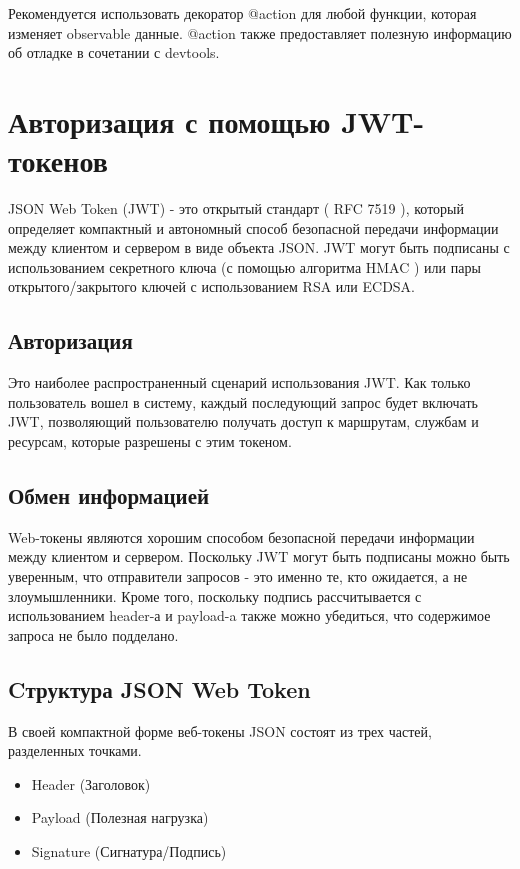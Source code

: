 \documentclass[12pt, a4paper]{diplom}
\begin{document}
Рекомендуется использовать декоратор @action для любой функции, которая изменяет observable данные. @action также предоставляет полезную информацию об отладке в сочетании с devtools.

\section{Авторизация с помощью JWT-токенов}

JSON Web Token (JWT)\cite{JWT} - это открытый стандарт ( RFC 7519 ), который определяет компактный и автономный способ безопасной передачи информации между клиентом и сервером в виде объекта JSON. 
JWT могут быть подписаны с использованием секретного ключа (с помощью алгоритма HMAC ) или пары открытого/закрытого ключей с использованием RSA или ECDSA.

\subsection{Авторизация}
Это наиболее распространенный сценарий использования JWT. Как только пользователь вошел в систему, каждый последующий запрос будет включать JWT, позволяющий пользователю получать доступ к маршрутам, службам и ресурсам, которые разрешены с этим токеном. 

\subsection{Обмен информацией}
Web-токены являются хорошим способом безопасной передачи информации между клиентом и сервером. Поскольку JWT могут быть подписаны можно быть уверенным, что отправители запросов - это именно те, кто ожидается, а не злоумышленники. Кроме того, поскольку подпись рассчитывается с использованием header-а и payload-a также можно убедиться, что содержимое запроса не было подделано.

\subsection{Cтруктура JSON Web Token}

В своей компактной форме веб-токены JSON состоят из трех частей, разделенных точками.

\begin{itemize}
  \item Header (Заголовок)
  \item Payload (Полезная нагрузка)
  \item Signature (Сигнатура/Подпись)
\end{itemize}
\end{document}
